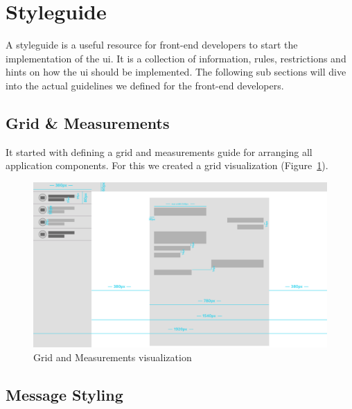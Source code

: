 \section{Styleguide}\label{sec:styleguide}
A styleguide is a useful resource for front-end developers to start the implementation of the \ac{ui}.
It is a collection of information, rules, restrictions and hints on how the \ac{ui} should be implemented.
The following sub sections will dive into the actual guidelines we defined for the front-end developers.

\subsection{Grid \& Measurements}\label{subsec:grid-and-measurements}

It started with defining a grid and measurements guide for arranging all application components. For this we created a
grid visualization (Figure~\ref{fig:grid}).

\begin{figure}[!ht]
    \centering
    \includegraphics[width=1.0\textwidth]{./graphics/grid}
    \caption{Grid and Measurements visualization}
    \label{fig:grid}
\end{figure}

\subsection{Message Styling}\label{subsec:message-styling}

